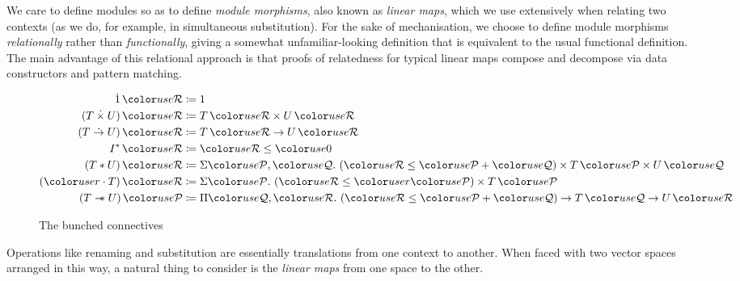 We care to define modules so as to define \emph{module morphisms}, also known
as \emph{linear maps}, which we use extensively when relating two contexts (as
we do, for example, in simultaneous substitution).
For the sake of mechanisation, we choose to define module morphisms
\emph{relationally} rather than \emph{functionally}, giving a somewhat
unfamiliar-looking definition that is equivalent to the usual functional
definition.
The main advantage of this relational approach is that proofs of relatedness
for typical linear maps compose and decompose via data constructors and
pattern matching.

\begin{figure}
  \begin{align*}
    \dot1\,\grR &\coloneqq 1 \\
    (T \dottimes U)\,\grR &\coloneqq T\,\grR \times U\,\grR \\
    (T \dotto U)\,\grR &\coloneqq T\,\grR \to U\,\grR \\
    I^*\,\grR &\coloneqq \grR \leq \gr0 \\
    (T \sep U)\,\grR &\coloneqq \Sigma \grP,\grQ.~\plr{\grR \leq \grP + \grQ}
                       \times T\,\grP \times U\,\grQ \\
    (\gr r \cdot T)\,\grR &\coloneqq \Sigma \grP.~\plr{\grR \leq \gr r\grP}
                       \times T\,\grP \\
    (T \wand U)\,\grP &\coloneqq \Pi \grQ,\grR.~\plr{\grR \leq \grP + \grQ}
                       \to T\,\grQ \to U\,\grR
  \end{align*}
  \caption{The bunched connectives}
  \label{fig:bunched}
\end{figure}

Operations like renaming and substitution are essentially translations from one
context to another.
When faced with two vector spaces arranged in this way, a natural thing to
consider is the \emph{linear maps} from one space to the other.
